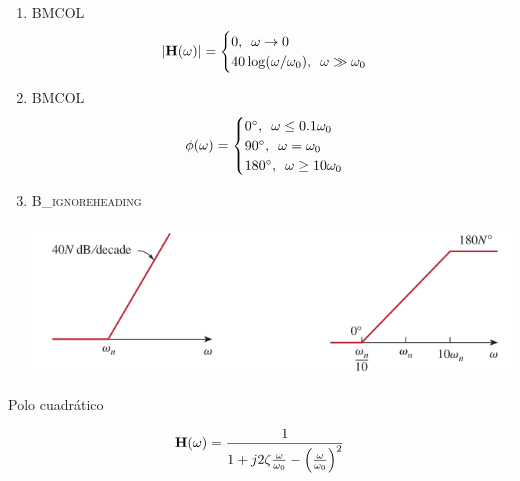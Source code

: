 \begin{enumerate}
\item \hfill{}\textsc{BMCOL}
\label{sec:org4e9c2ca}
\[
  |\mathbf{H}(\omega)| = 
  \begin{cases}
  0, \enskip \omega \to 0\\
  40 \log (\omega/\omega_0), \enskip \omega \gg \omega_0\\
  \end{cases}
\]

\item \hfill{}\textsc{BMCOL}
\label{sec:orgd9fd893}
\[
  \phi(\omega) = 
  \begin{cases}
    \ang{0},\enskip \omega \leq 0.1\omega_0\\
    \ang{90}, \enskip \omega = \omega_0\\
    \ang{180}, \enskip \omega \geq 10 \omega_0
  \end{cases}
\]

\item \hfill{}\textsc{B\_ignoreheading}
\label{sec:orga137928}
\begin{center}
\includegraphics[height=4cm]{../figs/BodeCeroCuadratico.pdf}
\end{center}
\end{enumerate}


{Polo cuadrático}

\[
  \mathbf{H}(\omega) = \frac{1}{1 + j 2 \zeta \frac{\omega}{\omega_0} - \left(\frac{\omega}{\omega_0}\right)^2} 
\]

